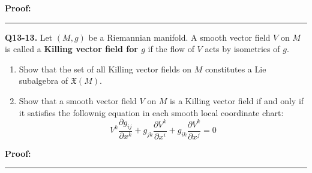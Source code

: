 \documentclass{article}
\begin{document}
\vskip 0.5cm
\textbf{Proof:}


\vskip 0.5cm
\hrule 
\vskip 0.5cm




\textbf{Q13-13.} Let $(M, g)$ be a Riemannian manifold. A smooth vector field $V$ on $M$ is called a \textbf{Killing vector field for $g$} if the flow of $V$ acts by isometries of $g$.
\begin{enumerate}[label=(\alph*)]
  \item Show that the set of all Killing vector fields on $M$ constitutes a Lie subalgebra of $\mathfrak{X}(M)$.
  \item Show that a smooth vector field $V$ on $M$ is a Killing vector field if and only if it satisfies the follownig equation in each smooth local coordinate chart:
  \[ V^k \frac{\partial g_{ij}}{\partial x^k} + g_{jk} \frac{\partial V^k}{\partial x^i} + g_{ik} \frac{\partial V^k}{\partial x^j} = 0 \]
\end{enumerate}

\vskip 0.5cm
\textbf{Proof:}


\vskip 0.5cm
\hrule 
\vskip 0.5cm












\end{document}
